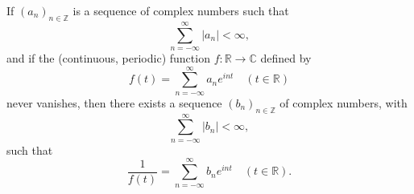If $(a_n)_{n \in \mathbb{Z}}$ is a sequence of complex numbers such that
$$\sum_{n=-\infty}^{\infty} |a_n| < \infty,$$
and if the (continuous, periodic) function $f: \mathbb{R} \to \mathbb{C}$ defined by
$$f(t) = \sum_{n=-\infty}^{\infty} a_n e^{int} \quad (t \in \mathbb{R})$$
never vanishes, then there exists a sequence $(b_n)_{n \in \mathbb{Z}}$ of complex numbers, with
$$\sum_{n=-\infty}^{\infty} |b_n| < \infty,$$
such that
$$\frac{1}{f(t)} = \sum_{n=-\infty}^{\infty} b_n e^{int} \quad (t \in \mathbb{R}).$$
